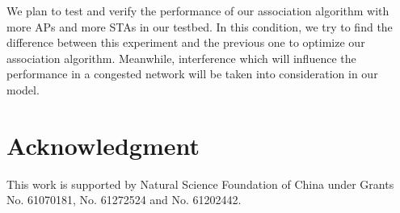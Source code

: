 \documentclass[conference]{IEEEtran}
\begin{document}
  We plan to test and verify the performance of our association algorithm with more APs and more STAs in our testbed. In this condition, we try to find the difference between this experiment and the previous one to optimize our association algorithm. Meanwhile, interference which will influence the performance in a congested network will be taken into consideration in our model.
\section*{Acknowledgment}

This work is supported by Natural Science Foundation of China under Grants No. 61070181, No. 61272524 and No. 61202442.

  
  













\end{document}
